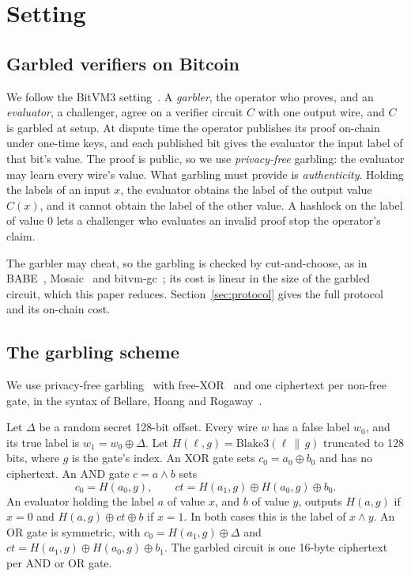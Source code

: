 \documentclass[11pt]{article}
\newcommand{\AND}{\textsf{AND}}
\newcommand{\XOR}{\textsf{XOR}}
\newcommand{\blake}{\mathrm{Blake3}}
\begin{document}
\section{Setting}\label{sec:setting}

\subsection{Garbled verifiers on Bitcoin}

We follow the BitVM3 setting~\cite{bitvm3paper}. A \emph{garbler}, the operator
who proves, and an \emph{evaluator}, a challenger, agree on a verifier circuit $C$
with one output wire, and $C$ is garbled at setup. At dispute time the operator
publishes its proof on-chain under one-time keys, and each published bit gives
the evaluator the input label of that bit's value. The proof is public, so we use
\emph{privacy-free} garbling: the evaluator may learn every wire's value. What
garbling must provide is \emph{authenticity}. Holding the labels of an input $x$,
the evaluator obtains the label of the output value $C(x)$, and it cannot obtain
the label of the other value. A hashlock on the label of value 0 lets a challenger
who evaluates an invalid proof stop the operator's claim.

The garbler may cheat, so the garbling is checked by cut-and-choose, as in
BABE~\cite{babe2026}, Mosaic~\cite{mosaic26} and bitvm-gc~\cite{bitvmgc}; its cost
is linear in the size of the garbled circuit, which this paper reduces.
Section~\ref{sec:protocol} gives the full protocol and its on-chain cost.

\subsection{The garbling scheme}\label{sec:garbling}

We use privacy-free garbling~\cite{fno15privacyfree} with free-XOR~\cite{ks08}
and one ciphertext per non-free gate, in the syntax of Bellare, Hoang and
Rogaway~\cite{bhr12foundations}.

Let $\Delta$ be a random
secret 128-bit offset. Every wire $w$ has a false label $w_0$, and its true label
is $w_1=w_0\oplus\Delta$. Let $H(\ell,g)=\blake(\ell\,\|\,g)$ truncated to 128
bits, where $g$ is the gate's index. An \XOR{} gate sets $c_0=a_0\oplus b_0$ and
has no ciphertext. An \AND{} gate $c=a\wedge b$ sets
\[
  c_0 = H(a_0,g), \qquad \mathit{ct} = H(a_1,g)\oplus H(a_0,g)\oplus b_0 .
\]
An evaluator holding the label $a$ of value $x$, and $b$ of value $y$, outputs
$H(a,g)$ if $x=0$ and $H(a,g)\oplus\mathit{ct}\oplus b$ if $x=1$. In both cases
this is the label of $x\wedge y$. An \textsf{OR} gate is symmetric, with
$c_0=H(a_1,g)\oplus\Delta$ and $\mathit{ct}=H(a_1,g)\oplus H(a_0,g)\oplus b_1$.
The garbled circuit is one 16-byte ciphertext per \AND{} or \textsf{OR} gate.
\end{document}
